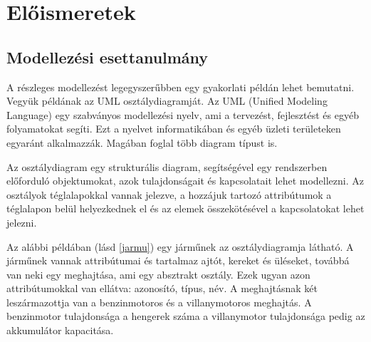 \chapter{Előismeretek}\label{chapter:preknowledge}

\section{Modellezési esettanulmány}

A részleges modellezést legegyszerűbben egy gyakorlati példán lehet bemutatni. Vegyük példának az UML \cite{UML} osztálydiagramját. Az UML (Unified Modeling Language) egy szabványos modellezési nyelv, ami a tervezést, fejlesztést és egyéb folyamatokat segíti. Ezt a nyelvet informatikában és egyéb üzleti területeken egyaránt alkalmazzák. Magában foglal több diagram típust is.
\par
Az osztálydiagram egy strukturális diagram, segítségével egy rendszerben előforduló objektumokat, azok tulajdonságait és kapcsolatait lehet modellezni. Az osztályok téglalapokkal vannak jelezve, a hozzájuk tartozó attribútumok a téglalapon belül helyezkednek el és az elemek összekötésével a kapcsolatokat lehet jelezni. 
\par
Az alábbi példában (lásd \autoref{jarmu}) egy járműnek az osztálydiagramja látható. A járműnek vannak attribútumai és tartalmaz ajtót, kereket és üléseket, továbbá van neki egy meghajtása, ami egy absztrakt osztály. Ezek ugyan azon attribútumokkal van ellátva: azonosító, típus, név. A meghajtásnak két leszármazottja van a benzinmotoros és a villanymotoros meghajtás. A benzinmotor tulajdonsága a hengerek száma a villanymotor tulajdonsága pedig az akkumulátor kapacitása.

